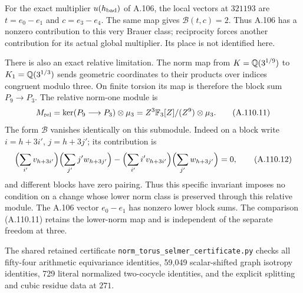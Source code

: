 For the exact multiplier $u(h_{\rm bad})$ of A.106, the local
vectors at $321193$ are $t=e_0-e_1$ and $c=e_3-e_4$.
The same map gives $\mathcal B(t,c)=2$.
Thus A.106 has a nonzero contribution to this very Brauer class;
reciprocity forces another contribution for its actual global
multiplier.  Its place is not identified here.

There is also an exact relative limitation.  The norm map from
$K=\mathbb Q(3^{1/9})$ to $K_1=\mathbb Q(3^{1/3})$ sends geometric
coordinates to their products over indices congruent modulo three.
On finite torsion its map is therefore the block sum
$P_9\to P_3$.  The relative norm-one module is
\[
 M_{\rm rel}=\ker(P_9\longrightarrow P_3)\otimes\mu_3
       =Z^3\mathbb F_3[Z]/(Z^9)\otimes\mu_3.
 \tag{A.110.11}
\]
The form $\mathcal B$ vanishes identically on this submodule.
Indeed on a block write $i=h+3i'$, $j=h+3j'$; its contribution
is
\[
 \Bigl(\sum_{i'}v_{h+3i'}\Bigr)
       \Bigl(\sum_{j'}j'w_{h+3j'}\Bigr)
 -\Bigl(\sum_{i'}i'v_{h+3i'}\Bigr)
       \Bigl(\sum_{j'}w_{h+3j'}\Bigr)=0,
 \tag{A.110.12}
\]
and different blocks have zero pairing.
Thus this specific invariant imposes no condition on a change
whose lower norm class is preserved through this relative module.
The A.106 vector $e_0-e_1$ has nonzero lower block sums.
The comparison (A.110.11) retains the lower-norm map and is
independent of the separate freedom at three.

The shared retained certificate
\texttt{norm\_torus\_selmer\_certificate.py}
checks all fifty-four arithmetic equivariance identities,
59,049 scalar-shifted graph isotropy identities, 729 literal
normalized two-cocycle identities, and the explicit splitting
and cubic residue data at $271$.
